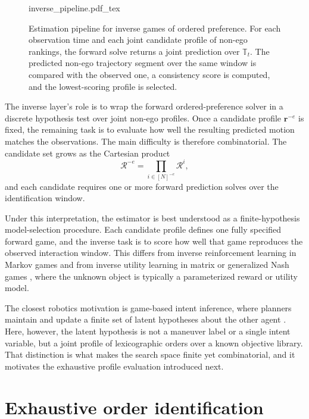 \begin{figure}[t]
    \centering
    \def\svgwidth{0.98\textwidth}
    {inverse_pipeline.pdf_tex}
    \caption{Estimation pipeline for inverse games of ordered preference. For each observation time and each
    joint candidate profile of non-ego rankings, the forward solve returns a joint prediction over
    \(\mathbb{T}_t\). The predicted non-ego trajectory segment over the same window is compared with the
    observed one, a consistency score is
    computed, and the lowest-scoring profile is selected.}
    \label{fig:inverse_pipeline}
\end{figure}

The inverse layer's role is to wrap the forward ordered-preference solver in a discrete hypothesis test over
joint non-ego profiles.
Once a candidate profile $\boldsymbol{r}^{-e}$ is fixed, the remaining task is to evaluate
how well the resulting predicted motion matches the observations.
The main difficulty is therefore combinatorial. The candidate set grows as the Cartesian product
\[
\mathcal R^{-e} = \prod_{i \in [N]^{-e}} \mathcal R^i,
\]
and each candidate requires one or more forward
prediction solves over the identification window.

Under this interpretation, the estimator is best understood as a finite-hypothesis model-selection
procedure. Each candidate profile defines one fully specified forward game, and the inverse task is
to score how well that game reproduces the observed interaction window. This differs from
inverse reinforcement learning in Markov games \cite{wang:2018,yu:2019} and from
inverse utility learning in matrix or generalized Nash games \cite{yu:2023,allen:2022},
where the unknown object is typically a parameterized reward or utility model.

The closest robotics motivation is game-based intent inference, where planners maintain and update
a finite set of latent hypotheses about the other agent \cite{wang:2020}. Here, however,
the latent hypothesis is not a maneuver label or a single intent variable, but a joint profile of
lexicographic orders over a known objective library. That distinction is what makes the search
space finite yet combinatorial, and it motivates the exhaustive profile evaluation introduced next.

\section{Exhaustive order identification}
\label{sec:inverse-baseline}

